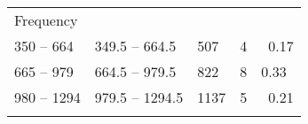 \documentclass[]{book}
\begin{document}
\begin{longtable}[]{@{}lllll@{}}
\begin{minipage}[t]{0.14\columnwidth}
Frequency\strut
\end{minipage}\tabularnewline
\begin{minipage}[t]{0.18\columnwidth}\raggedright
350 -- 664\strut
\end{minipage} & \begin{minipage}[t]{0.23\columnwidth}\raggedright
349.5 -- 664.5\strut
\end{minipage} & \begin{minipage}[t]{0.13\columnwidth}\raggedright
507\strut
\end{minipage} & \begin{minipage}[t]{0.14\columnwidth}\raggedright
4\strut
\end{minipage} & \begin{minipage}[t]{0.14\columnwidth}\raggedright
~0.17\strut
\end{minipage}\tabularnewline
\begin{minipage}[t]{0.18\columnwidth}\raggedright
665 -- 979\strut
\end{minipage} & \begin{minipage}[t]{0.23\columnwidth}\raggedright
664.5 -- 979.5\strut
\end{minipage} & \begin{minipage}[t]{0.13\columnwidth}\raggedright
822\strut
\end{minipage} & \begin{minipage}[t]{0.14\columnwidth}\raggedright
8\strut
\end{minipage} & \begin{minipage}[t]{0.14\columnwidth}\raggedright
0.33\strut
\end{minipage}\tabularnewline
\begin{minipage}[t]{0.18\columnwidth}\raggedright
980 -- 1294\strut
\end{minipage} & \begin{minipage}[t]{0.23\columnwidth}\raggedright
979.5 -- 1294.5\strut
\end{minipage} & \begin{minipage}[t]{0.13\columnwidth}\raggedright
1137\strut
\end{minipage} & \begin{minipage}[t]{0.14\columnwidth}\raggedright
5\strut
\end{minipage} & \begin{minipage}[t]{0.14\columnwidth}\raggedright
~0.21\strut
\end{minipage}\tabularnewline
\begin{minipage}[t]{0.18\columnwidth}\raggedright

\end{minipage}
\end{longtable}
\end{document}

